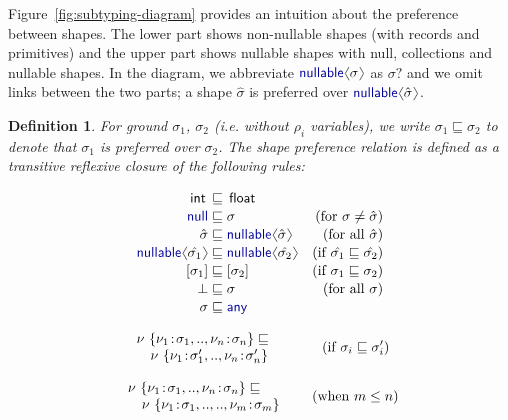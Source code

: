 \documentclass[10pt,nocopyrightspace]{sigplanconf}
\newcommand{\langl}{\begin{picture}(4.5,7)
\put(1.1,2.5){\rotatebox{60}{\line(1,0){5.5}}}
\put(1.1,2.5){\rotatebox{300}{\line(1,0){5.5}}}
\end{picture}}
\newcommand{\rangl}{\begin{picture}(4.5,7)
\put(.9,2.5){\rotatebox{120}{\line(1,0){5.5}}}
\put(.9,2.5){\rotatebox{240}{\line(1,0){5.5}}}
\end{picture}}
\newcommand{\kvd}[1]{\textnormal{\textcolor{kvdclr}{\sffamily #1}}}
\newcommand{\ident}[1]{\textnormal{\sffamily #1}}
\newtheorem{definition}{Definition}
\begin{document}
Figure~\ref{fig:subtyping-diagram} provides an intuition about the preference between
shapes. The lower part shows non-nullable shapes (with records and primitives) and the upper part
shows nullable shapes with \kvd{null}, collections and nullable shapes. In the diagram, we
abbreviate $\kvd{nullable}\langl\sigma\rangl$ as $\sigma?$ and we omit links between the two parts;
a shape $\hat{\sigma}$ is preferred over $\kvd{nullable}\langl\hat{\sigma}\rangl$.

\begin{definition}
For ground $\sigma_1$, $\sigma_2$ (i.e. without $\rho_i$ variables), we write $\sigma_1 \sqsubseteq \sigma_2$ to denote that $\sigma_1$ is preferred over $\sigma_2$.
The shape preference relation is defined as a transitive reflexive closure of the following rules:

\noindent
\begin{align}
  \label{eq:sub-prim}
  \ident{int}\,&\sqsubseteq\,\ident{float}&\\[-0.2em]
  \label{eq:sub-null}
  \kvd{null} &\sqsubseteq \sigma  &(\textnormal{for}~\sigma \neq \hat{\sigma})  \\[-0.2em]
  \label{eq:sub-opt}
  \hat{\sigma} &\sqsubseteq \kvd{nullable}\langl\hat{\sigma}\rangl  &(\textnormal{for all}~\hat{\sigma})\\[-0.2em]
  \label{eq:sub-opt-cov}
  \kvd{nullable}\langl\hat{\sigma_1}\rangl &\sqsubseteq
    \kvd{nullable}\langl\hat{\sigma_2}\rangl  &(\textnormal{if}~\hat{\sigma_1} \sqsubseteq \hat{\sigma_2})\\[-0.2em]
  \label{eq:sub-col}
  [\sigma_1] &\sqsubseteq [\sigma_2]  &(\textnormal{if}~\sigma_1 \sqsubseteq \sigma_2) \\[-0.2em]
  \label{eq:sub-bot}
  \bot &\sqsubseteq \sigma  &(\textnormal{for all}~\sigma)\\[-0.2em]
  \label{eq:sub-var-top}
  \sigma &\sqsubseteq \kvd{any}
\end{align}
\vspace{-2em}

\noindent
\begin{align}
\label{eq:sub-record1}
\begin{array}{l}
 \nu~\{ \nu_1\!:\!\sigma_1, .., \nu_n\!:\!\sigma_n \} \sqsubseteq \\
 \quad\nu~\{ \nu_1\!:\!\sigma_1', .., \nu_n\!:\!\sigma_n' \}
\end{array} \qquad ~~~~(\textnormal{if}~\sigma_i \sqsubseteq \sigma_i')
\end{align}

\vspace{-1.5em}

\begin{align}
\label{eq:sub-record2}
\begin{array}{l}
 \nu~\{ \nu_1\!:\!\sigma_1, .., \nu_n\!:\!\sigma_n \} \sqsubseteq \\
 \quad\nu~\{ \nu_1\!:\!\sigma_1, .., .., \nu_m\!:\!\sigma_m \}
\end{array} \quad~~\, (\textnormal{when}~m \leq n)
\end{align}

\end{definition}
\end{document}
